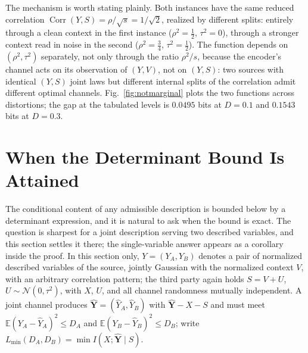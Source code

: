﻿\documentclass[11pt,onecolumn]{IEEEtran}
\newcommand{\E}{\mathbb{E}}
\newcommand{\hY}{\widehat{Y}}
\begin{document}
The mechanism is worth stating plainly. Both instances have the same
reduced correlation $\operatorname{Corr}(Y,S)=\rho/\sqrt{s}=1/\sqrt2$,
realized by different splits: entirely through a clean context in the
first instance ($\rho^2=\tfrac12$, $\tau^2=0$), through a stronger
context read in noise in the second ($\rho^2=\tfrac34$,
$\tau^2=\tfrac12$). The function depends on $(\rho^2,\tau^2)$
separately, not only through the ratio $\rho^2/s$, because the
encoder's channel acts on its observation of $(Y,V)$, not on $(Y,S)$:
two sources with identical $(Y,S)$ joint laws but different internal
splits of the correlation admit different optimal channels.
Fig.~\ref{fig:notmarginal} plots the two functions across distortions;
the gap at the tabulated levels is $0.0495$ bits at $D=0.1$ and
$0.1543$ bits at $D=0.3$.

\section{When the Determinant Bound Is Attained}
\label{sec:floor}

The conditional content of any admissible description is bounded below by a
determinant expression, and it is natural to ask when the bound is exact. The
question is sharpest for a joint description serving two described variables,
and this section settles it there; the single-variable answer appears as a
corollary inside the proof. In this section only, $Y=(Y_A,Y_B)$ denotes a
pair of normalized described variables of the source, jointly Gaussian with
the normalized
context $V$, with an arbitrary correlation pattern; the third party again
holds $S=V+U$, $U\sim\mathcal N(0,\tau^2)$, with $X$, $U$, and all channel
randomness mutually independent. A joint channel produces
$\hat{\mathbf Y}=(\hY_A,\hY_B)$ with $\hat{\mathbf Y}-X-S$ and must meet
$\E(Y_A-\hY_A)^2\le D_A$ and $\E(Y_B-\hY_B)^2\le D_B$; write
$L_{\min}(D_A,D_B)=\min I(X;\hat{\mathbf Y}\mid S)$.
\end{document}
